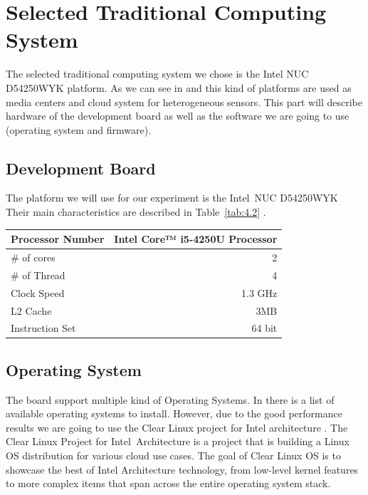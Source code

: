 \section{Selected Traditional Computing System}
\noindent

The selected traditional computing system we chose is the Intel NUC D54250WYK
platform. As we can see in \cite{Bo} and \cite{Shen} this kind of platforms are
used as media centers and cloud system for heterogeneous sensors. This part
will describe hardware of the development board as well as the software we are
going to use (operating system and firmware).

\subsection{Development Board} 

The platform we will use for our experiment is the
Intel\textregistered\ NUC D54250WYK Their main characteristics are
described in Table~\ref{tab:4.2} \cite{NUC}.

    \begin{center}
    \begin{tabular}{ | l | r |}
        \hline
        Processor Number & Intel Core™ i5-4250U Processor \\ \hline
        \# of cores &  2 \\ \hline
        \# of Thread & 4  \\ \hline
        Clock Speed & 1.3 GHz  \\ \hline
        L2 Cache & 3MB  \\ \hline
        Instruction Set & 64 bit  \\ \hline
    \end{tabular}
     \label{tab:4.2}
    \end{center}


\subsection{Operating System} 

The board support multiple kind of Operating Systems. In \cite{NUC-OS} there is
a list of available operating systems to install. However, due to the good
performance results \cite{phoronix-clear} we are going to use the Clear Linux
project for Intel architecture \cite{clear-linux}. The Clear Linux Project for
Intel\textregistered\ Architecture is a project that is building a Linux OS
distribution for various cloud use cases. The goal of Clear Linux OS is to
showcase the best of Intel Architecture technology, from low-level kernel
features to more complex items that span across the entire operating system
stack.


